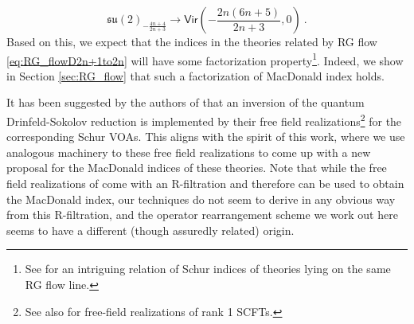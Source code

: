 \documentclass[a4paper,10pt]{article}
\newcommand{\mr}[1]{\mathsf{#1}}
\newcommand{\tsf}[1]{\textsf{#1}}
\newcommand{\mf}[1]{\mathfrak{#1}}
\begin{document}
\begin{equation}
    \mf{su}(2)_{-\frac{4n+4}{2n+3}}\to\mr{Vir}\left(-\frac{2n(6n+5)}{2n+3},0\right)~.
\end{equation}
Based on this, we expect that the indices in the theories related by \tsf{RG} flow \eqref{eq:RG_flowD2n+1to2n} will have some factorization property\footnote{See \cite{Deb:2025ypl} for an intriguing relation of Schur indices of theories lying on the same \tsf{RG} flow line.}. Indeed, we show in Section \ref{sec:RG_flow} that such a factorization of MacDonald index holds. 
\par
It has been suggested by the authors of \cite{Beem:2019tfp} that an inversion of the quantum Drinfeld-Sokolov reduction is implemented by their free field realizations\footnote{See also \cite{Beem:2024fom} for free-field realizations of rank 1 \tsf{SCFT}s.} for the corresponding Schur \tsf{VOA}s. This aligns with the spirit of this work, where we use analogous machinery to these free field realizations to come up with a new proposal for the MacDonald indices of these theories. Note that while the free field realizations of \cite{Beem:2019tfp} come with an R-filtration and therefore can be used to obtain the MacDonald index, our techniques do not seem to derive in any obvious way from this R-filtration, and the operator rearrangement scheme we work out here seems to have a different (though assuredly related) origin. \\
\end{document}

